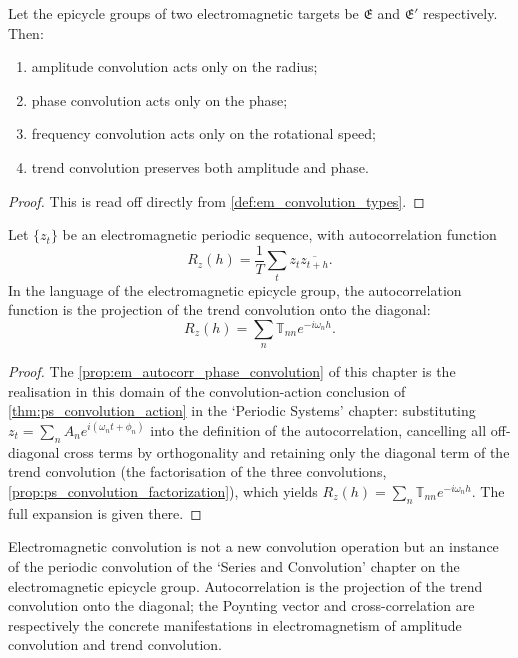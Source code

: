 \begin{theorem}\label{thm:em_convolution_action}
Let the epicycle groups of two electromagnetic targets be $\mathfrak E$ and $\mathfrak E'$ respectively. Then:
\begin{enumerate}[label=(\roman*)]
    \item amplitude convolution acts only on the radius;
    \item phase convolution acts only on the phase;
    \item frequency convolution acts only on the rotational speed;
    \item trend convolution preserves both amplitude and phase.
\end{enumerate}
\end{theorem}

\begin{proof}
This is read off directly from \cref{def:em_convolution_types}.
\end{proof}

\begin{proposition}\label{prop:em_autocorr_phase_convolution}
Let $\{z_t\}$ be an electromagnetic periodic sequence, with autocorrelation function
\[
R_z(h)=\frac1T\sum_t z_t\overline{z_{t+h}}.
\]
In the language of the electromagnetic epicycle group, the autocorrelation function is the projection of the trend convolution onto the diagonal:
\[
R_z(h)=\sum_n\mathbb T_{nn}e^{-i\omega_n h}.
\]
\end{proposition}

\begin{proof}
The \cref{prop:em_autocorr_phase_convolution} of this chapter is the realisation in this domain of the convolution-action conclusion of \cref{thm:ps_convolution_action} in the `Periodic Systems' chapter:
substituting $z_t=\sum_n A_n e^{i(\omega_n t+\phi_n)}$ into the definition of the autocorrelation, cancelling all off-diagonal cross terms by orthogonality and retaining only the diagonal term of the trend convolution
(the factorisation of the three convolutions, \cref{prop:ps_convolution_factorization}), which yields $R_z(h)=\sum_n\mathbb T_{nn}e^{-i\omega_n h}$.
The full expansion is given there.
\end{proof}

\begin{remark}\label{rem:em_convolution_relation}
Electromagnetic convolution is not a new convolution operation but an instance of the periodic convolution of the `Series and Convolution' chapter on the electromagnetic epicycle group. Autocorrelation is the projection of the trend convolution onto the diagonal; the Poynting vector and cross-correlation are respectively the concrete manifestations in electromagnetism of amplitude convolution and trend convolution.
\end{remark}

